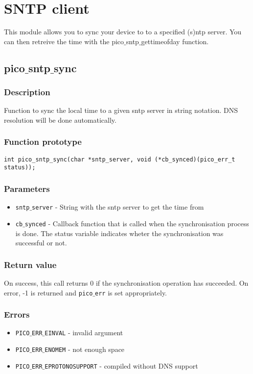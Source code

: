 \section{SNTP client}

This module allows you to sync your device to to a specified (s)ntp server.
You can then retreive the time with the pico$\_$sntp$\_$gettimeofday function.


\subsection{pico$\_$sntp$\_$sync}

\subsubsection*{Description}
Function to sync the local time to a given sntp server in string notation. DNS resolution will be done automatically.
\subsubsection*{Function prototype}
\begin{verbatim}
int pico_sntp_sync(char *sntp_server, void (*cb_synced)(pico_err_t status));
\end{verbatim}

\subsubsection*{Parameters}
\begin{itemize}[noitemsep]
\item \texttt{sntp$\_$server} - String with the sntp server to get the time from
\item \texttt{cb$\_$synced} - Callback function that is called when the synchronisation process is done. The status variable indicates wheter the synchronisation was successful or not.
\end{itemize}

\subsubsection*{Return value}
On success, this call returns 0 if the synchronisation operation has succeeded.
On error, -1 is returned and \texttt{pico$\_$err} is set appropriately.

\subsubsection*{Errors}
\begin{itemize}[noitemsep]
\item \texttt{PICO$\_$ERR$\_$EINVAL} - invalid argument
\item \texttt{PICO$\_$ERR$\_$ENOMEM} - not enough space
\item \texttt{PICO$\_$ERR$\_$EPROTONOSUPPORT} - compiled without DNS support
\end{itemize}

